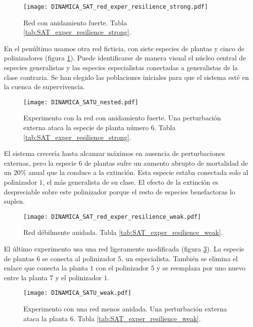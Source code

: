 \begin{figure}[h!]
\centering
\texttt{[image: DINAMICA\_SAT\_red\_exper\_resilience\_strong.pdf]}
\caption {Red con anidamiento fuerte. Tabla \ref{tab:SAT_exper_resilience_strong}.}
\label{fig:DINAMICA_SAT_red_exper_resilience_strong}
\end{figure}

En el penúltimo usamos otra red ficticia, con siete especies de plantas y cinco de polinizadores (figura \ref{fig:DINAMICA_SAT_red_exper_resilience_strong}). Puede identificarse de manera visual el núcleo central de especies generalistas y las especies especialistas conectadas a generalistas de la clase contraria. Se han elegido las poblaciones iniciales para que el sistema esté en la cuenca de supervivencia.

\begin{figure}[h!]
\centering
\texttt{[image: DINAMICA\_SATU\_nested.pdf]}
\caption {Experimento con la red con anidamiento fuerte. Una perturbación externa ataca la especie de planta número $6$. Tabla \ref{tab:SAT_exper_resilience_strong}.}
\label{fig:DINAMICA_SAT_exper_resilience_strong}
\end{figure}

El sistema crecería hasta alcanzar máximos en ausencia de perturbaciones externas, pero la especie $6$ de plantas sufre un aumento abrupto de mortalidad de un $20\%$ anual que la conduce a la extinción. Esta especie estaba conectada solo al polinizador $1$, el más generalista de su clase. El efecto de la extinción es despreciable sobre este polinizador porque el resto de especies benefactoras lo suplen. 

\begin{figure}[h!]
\centering
\texttt{[image: DINAMICA\_SAT\_red\_exper\_resilience\_weak.pdf]}
\caption {Red débilmente anidada. Tabla \ref{tab:SAT_exper_resilience_weak}.}
\label{fig:DINAMICA_SAT_red_exper_resilience_weak}
\end{figure}

El último experimento usa una red ligeramente modificada (figura  \ref{fig:DINAMICA_SAT_red_exper_resilience_weak}). La especie de plantas $6$ se conecta al polinizador $5$, un especialista. También se elimina el enlace que conecta la planta $1$ con el polinizador $5$ y se reemplaza por uno nuevo entre la planta $7$ y el polinizador $1$.  

\begin{figure}[ht!]
\centering
\texttt{[image: DINAMICA\_SATU\_weak.pdf]}
\caption {Experimento con una red menos anidada. Una perturbación externa ataca la planta $6$. Tabla \ref{tab:SAT_exper_resilience_weak}.}
\label{fig:DINAMICA_SAT_exper_resilience_weak}
\end{figure}

